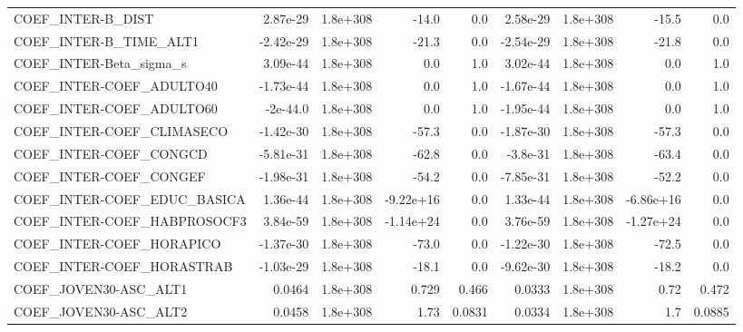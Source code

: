 \begin{tabular}{lrrrrrrrr}
COEF\_INTER-B\_DIST                 &    2.87e-29 &     1.8e+308 &     -14.0 &      0.0 &   2.58e-29 &    1.8e+308 &        -15.5 &           0.0 \\
COEF\_INTER-B\_TIME\_ALT1            &   -2.42e-29 &     1.8e+308 &     -21.3 &      0.0 &  -2.54e-29 &    1.8e+308 &        -21.8 &           0.0 \\
COEF\_INTER-Beta\_sigma\_s           &    3.09e-44 &     1.8e+308 &       0.0 &      1.0 &   3.02e-44 &    1.8e+308 &          0.0 &           1.0 \\
COEF\_INTER-COEF\_ADULTO40          &   -1.73e-44 &     1.8e+308 &       0.0 &      1.0 &  -1.67e-44 &    1.8e+308 &          0.0 &           1.0 \\
COEF\_INTER-COEF\_ADULTO60          &    -2e-44.0 &     1.8e+308 &       0.0 &      1.0 &  -1.95e-44 &    1.8e+308 &          0.0 &           1.0 \\
COEF\_INTER-COEF\_CLIMASECO         &   -1.42e-30 &     1.8e+308 &     -57.3 &      0.0 &  -1.87e-30 &    1.8e+308 &        -57.3 &           0.0 \\
COEF\_INTER-COEF\_CONGCD            &   -5.81e-31 &     1.8e+308 &     -62.8 &      0.0 &   -3.8e-31 &    1.8e+308 &        -63.4 &           0.0 \\
COEF\_INTER-COEF\_CONGEF            &   -1.98e-31 &     1.8e+308 &     -54.2 &      0.0 &  -7.85e-31 &    1.8e+308 &        -52.2 &           0.0 \\
COEF\_INTER-COEF\_EDUC\_BASICA       &    1.36e-44 &     1.8e+308 & -9.22e+16 &      0.0 &   1.33e-44 &    1.8e+308 &    -6.86e+16 &           0.0 \\
COEF\_INTER-COEF\_HABPROSOCF3       &    3.84e-59 &     1.8e+308 & -1.14e+24 &      0.0 &   3.76e-59 &    1.8e+308 &    -1.27e+24 &           0.0 \\
COEF\_INTER-COEF\_HORAPICO          &   -1.37e-30 &     1.8e+308 &     -73.0 &      0.0 &  -1.22e-30 &    1.8e+308 &        -72.5 &           0.0 \\
COEF\_INTER-COEF\_HORASTRAB         &   -1.03e-29 &     1.8e+308 &     -18.1 &      0.0 &  -9.62e-30 &    1.8e+308 &        -18.2 &           0.0 \\
COEF\_JOVEN30-ASC\_ALT1             &      0.0464 &     1.8e+308 &     0.729 &    0.466 &     0.0333 &    1.8e+308 &         0.72 &         0.472 \\
COEF\_JOVEN30-ASC\_ALT2             &      0.0458 &     1.8e+308 &      1.73 &   0.0831 &     0.0334 &    1.8e+308 &          1.7 &        0.0885 \\

\end{tabular}
